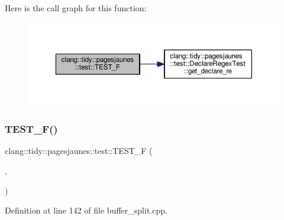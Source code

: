 Here is the call graph for this function\+:
\nopagebreak
\begin{figure}[H]
\begin{center}
\leavevmode
\includegraphics[width=350pt]{namespaceclang_1_1tidy_1_1pagesjaunes_1_1test_aaa3c4ff6200f2363ea4b6b6f956b1463_cgraph}
\end{center}
\end{figure}
\mbox{\label{namespaceclang_1_1tidy_1_1pagesjaunes_1_1test_a16c0b3f2dcc4de39bf59735e18c9611c}} 
\subsubsection{\texorpdfstring{T\+E\+S\+T\+\_\+\+F()}{TEST\_F()}\hspace{0.1cm}{\footnotesize\ttfamily [33/57]}}
{\footnotesize\ttfamily clang\+::tidy\+::pagesjaunes\+::test\+::\+T\+E\+S\+T\+\_\+F (\begin{DoxyParamCaption}\item[{\hyperlink{classclang_1_1tidy_1_1pagesjaunes_1_1test_1_1_buffer_split_test}{Buffer\+Split\+Test}}]{,  }\item[{One\+Line\+With\+No\+C\+R\+Buffer}]{ }\end{DoxyParamCaption})}



Definition at line 142 of file buffer\+\_\+split.\+cpp.

